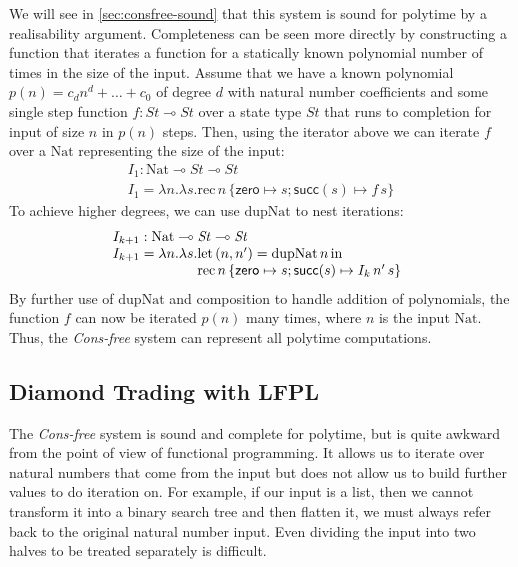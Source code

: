 \documentclass[acmsmall,screen]{acmart}
\newcommand{\tmRec}{\mathrm{rec}}
\newcommand{\tyNat}{\mathrm{Nat}}
\newcommand{\conZero}{\mathsf{zero}}
\newcommand{\conSucc}{\mathsf{succ}}
\newcommand{\Let}{\mathrm{let}}
\newcommand{\In}{\mathrm{in}}
\newcommand{\dupNat}{\mathrm{dupNat}}
\newcommand{\ConsFree}{\emph{Cons-free}}
\begin{document}
We will see in \autoref{sec:consfree-sound} that this system is sound
for polytime by a realisability argument. Completeness can be seen
more directly by constructing a function that iterates a function for
a statically known polynomial number of times in the size of the
input. Assume that we have a known polynomial
$p(n) = c_dn^d + \dots + c_0$ of degree $d$ with natural number
coefficients and some single step function
$f : \mathit{St} \multimap \mathit{St}$ over a state type
$\mathit{St}$ that runs to completion for input of size $n$ in $p(n)$
steps. Then, using the iterator above we can iterate $f$ over a
$\tyNat$ representing the size of the input:
\begin{displaymath}
  \begin{array}{l}
    I_1 : \tyNat \multimap \mathit{St} \multimap \mathit{St} \\
    I_1 = \lambda n. \lambda s.\tmRec\,n\,\{\conZero \mapsto s; \conSucc(s) \mapsto f\,s \}
  \end{array}
\end{displaymath}
To achieve higher degrees, we can use $\dupNat$ to nest iterations:
\begin{displaymath}
  \begin{array}{l}
    I_{k+1} : \tyNat \multimap \mathit{St} \multimap \mathit{St} \\
    I_{k+1} = \lambda n. \lambda s.
    \begin{array}[t]{@{}l}
      \Let\,(n,n') = \dupNat\,n\,\In\\
      \tmRec\,n\,\{\conZero \mapsto s; \conSucc(s) \mapsto I_k\,n'\,s \}
    \end{array}
  \end{array}
\end{displaymath}
By further use of $\dupNat$ and composition to handle addition of
polynomials, the function $f$ can now be iterated $p(n)$ many times,
where $n$ is the input $\tyNat$. Thus, the \ConsFree{} system can
represent all polytime computations.

\subsection{Diamond Trading with LFPL}
\label{sec:lfpl-intro}

The \ConsFree{} system is sound and complete for polytime, but is quite
awkward from the point of view of functional programming. It allows us
to iterate over natural numbers that come from the input but does not
allow us to build further values to do iteration on. For example, if
our input is a list, then we cannot transform it into a binary search
tree and then flatten it, we must always refer back to the original
natural number input. Even dividing the input into two halves to be
treated separately is difficult.
\end{document}
